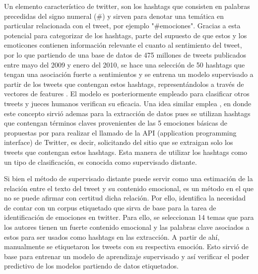 Un elemento característico de twitter, son los hashtags que consisten en palabras precedidas del signo numeral (\#) y sirven para denotar una temática en particular relacionada con el tweet, por ejemplo "\#emociones". Gracias a esta potencial para categorizar de los hashtags,\cite{davidov2010enhanced} parte del supuesto de que estos y los emoticones contienen información relevante el cuanto al sentimiento del tweet, por lo que partiendo de una base de datos de 475 millones de tweets publicados entre mayo del 2009 y enero del 2010, se hace una selección de 50 hashtags que tengan una asociación fuerte a sentimientos y se entrena un modelo supervisado a partir de los tweets que contengan estos hashtags, representándolos a través de vectores de features . El modelo es posteriormente empleado para clasificar otros tweets y jueces humanos verifican su eficacia. Una idea similar emplea \cite{wang2012harnessing}, en donde este concepto sirvió ademas para la extracción de datos pues  se utilizan hashtags que contengan términos claves provenientes de las 5 emociones básicas de propuestas por \cite{ekman1993facial} para realizar el llamado de la API (application programming interface) de Twitter, es decir, solicitando del sitio que se extraigan solo los tweets que contengan estos hashtags. Esta manera de utilizar los hashtags como un tipo de clasificación, es conocida como supervisado distante.

Si bien el método de supervisado distante puede servir como una estimación de la relación entre el texto del tweet y su contenido emocional, es un método en el que no se puede afirmar con certitud dicha relación. Por ello, \cite{roberts2012empatweet} identifica la necesidad de contar con un corpus etiquetado que sirva de base para la tarea de identificación de emociones en twitter. Para ello, se seleccionan  14 temas que para los autores tienen un fuerte contenido emocional y las palabras clave asociados a estos para ser usados como hashtags en las extracción. A partir de ahí, manualmente se etiquetaron los tweets con su respectiva emoción. Esto sirvió de base para entrenar un modelo de aprendizaje supervisado y así verificar el poder predictivo de los modelos partiendo de datos etiquetados.

